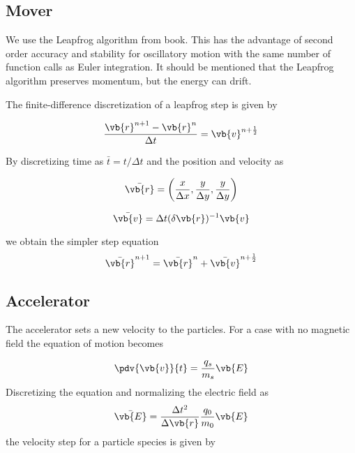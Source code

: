         \subsection{Mover}
            We use the Leapfrog algorithm from \textit{} \citep{birdsall_plasma_2004}
            book. This has the advantage of second order accuracy and stability for oscillatory motion
            with the same number of function calls as Euler integration. It should
            be mentioned that the Leapfrog algorithm preserves momentum, but the
            energy can drift.

            \noindent The finite-difference discretization of a leapfrog step is given by

            \begin{equation}
                \frac{\vb{r}^{n+1}-\vb{r}^n}{\Delta t} = \vb{v}^{n+\frac{1}{2}}
            \end{equation}

            \noindent By discretizing time as \(\bar{t}= t/\Delta t\) and the position and velocity as

            \begin{equation}
                    \bar{\vb{r}} = \left( \frac{x}{\Delta x}, \frac{y}{\Delta y}, \frac{y}{\Delta y} \right)
            \end{equation}

            \begin{equation}
                \bar{\vb{v}} = \Delta t (\delta \vb{r})^{-1} \vb{v}
            \end{equation}

            \noindent we obtain the simpler step equation
            \begin{equation}
                \bar{\vb{r}}^{n+1} = \bar{\vb{r}}^{n} + \bar{\vb{v}}^{n+\frac{1}{2}}
            \end{equation}

        \subsection{Accelerator}
            The accelerator sets a new velocity to the particles. For a case with
            no magnetic field the equation of motion becomes

            \begin{equation}
                \pdv{\vb{v}}{t} = \frac{q_s}{m_s} \vb{E}
            \end{equation}
%
            Discretizing the equation and normalizing the electric field as
            \begin{equation}
                \bar{\vb{E}} = \frac{\Delta t^2}{\Delta \vb{r}} \frac{q_0}{m_0}\vb{E}
            \end{equation}
%
            the velocity step for a particle species is given by


